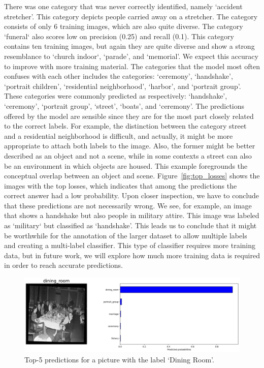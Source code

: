 \documentclass[a4paper,twoside]{article}
\begin{document}
There was one category that was never correctly identified, namely `accident stretcher'. This category depicts people carried away on a stretcher. 
The category consists of only 6 training images, which are also quite diverse. The category `funeral` also scores low on precision (0.25) and recall (0.1). 
This category contains ten training images, but again they are quite diverse and show a strong resemblance to `church indoor`, `parade', and `memorial'. 
We expect this accuracy to improve with more training material.
The categories that the model most often confuses with each other includes the categories: `ceremony', `handshake', `portrait children', `residential neighborhood', `harbor', and `portrait group'. 
These categories were commonly predicted as respectively: `handshake', `ceremony', `portrait group', `street', `boats', and `ceremony'. 
The predictions offered by the model are sensible since they are for the most part closely related to the correct labels.
For example, the distinction between the category street and a residential neighborhood is difficult, and actually, it might be more appropriate to attach both labels to the image. 
Also, the former might be better described as an object and not a scene, while in some contexts a street can also be an environment in which objects are housed. 
This example foregrounds the conceptual overlap between an object and scene.
Figure~\ref{fig:top_losses} shows the images with the top losses, which indicates that among the predictions the correct answer had a low probability.
Upon closer inspection, we have to conclude that these predictions are not necessarily wrong. 
We see, for example, an image that shows a handshake but also people in military attire. 
This image was labeled as `military` but classified as `handshake'.
This leads us to conclude that it might be worthwhile for the annotation of the larger dataset to allow multiple labels and creating a multi-label classifier. 
This type of classifier requires more training data, but in future work, we will explore how much more training data is required in order to reach accurate predictions.

%
\begin{figure}
	\centering
 	\includegraphics[width=\linewidth]{figures/dining_room.png}
 	\caption{Top-5 predictions for a picture with the label `Dining Room'.}
 	\label{fig:dining_room_example}
\end{figure}
\end{document}
